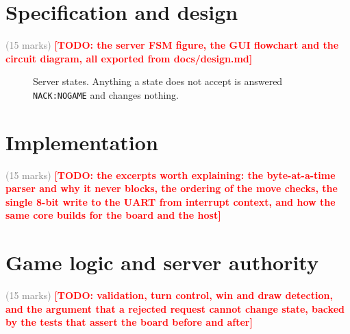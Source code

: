 \documentclass[conference]{IEEEtran}
\newcommand{\todo}[1]{\textcolor{red}{\textbf{[TODO: #1]}}}
\newcommand{\weight}[1]{\textcolor{gray}{\small(#1 marks)}}
\begin{document}
\section{Specification and design} \weight{15}
\todo{the server FSM figure, the GUI flowchart and the circuit diagram, all
exported from docs/design.md}

\begin{figure}[htbp]
\centering
{}
\caption{Server states. Anything a state does not accept is answered
\texttt{NACK:NOGAME} and changes nothing.}
\label{fig:fsm}
\end{figure}

\section{Implementation} \weight{15}
\todo{the excerpts worth explaining: the byte-at-a-time parser and why it never
blocks, the ordering of the move checks, the single 8-bit write to the UART
from interrupt context, and how the same core builds for the board and the
host}

\section{Game logic and server authority} \weight{15}
\todo{validation, turn control, win and draw detection, and the argument that a
rejected request cannot change state, backed by the tests that assert the board
before and after}
\end{document}
